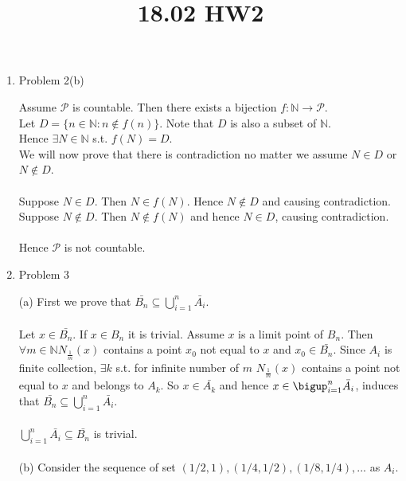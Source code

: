 \documentclass{article}
\title{18.02 HW2}
\begin{document}
\maketitle

\begin{enumerate}
    \item Problem 2(b)
    
        Assume $\mathcal{P}$ is countable. Then there exists a bijection $f: \mathbb{N} \to \mathcal{P}$. \\ 
        Let $D = \{n \in \mathbb{N} : n \notin f(n)\}$. Note that $D$ is also a subset of $\mathbb{N}$.
        \\
        Hence $\exists N \in \mathbb{N}$ s.t. $f(N) = D$.
        \\
        We will now prove that there is contradiction no matter we assume $N \in D$ or $N \notin D$.
        \\
        \\
        Suppose $N \in D$. Then $N \in f(N)$. Hence $N \notin D$ and causing contradiction.
        \\
        Suppose $N \notin D$. Then $N \notin f(N)$ and hence $N \in D$, causing contradiction.
        \\
        \\
        Hence $\mathcal{P}$ is not countable.


    \item Problem 3
    
        (a) First we prove that $\bar{B_n} \subseteq \bigcup_{i=1}^{n} \bar{A_i}$.
        \\
        \\
        Let $x \in \bar{B_n}$. If $x \in B_n$ it is trivial. Assume $x$ is a limit point of $B_n$. Then $\forall m \in \mathbb{N} N_{\frac{1}{m}}(x)$ contains a point $x_0$ not equal to $x$ and $x_0 \in \bar{B_n}$. Since $A_i$ is finite collection, $\exists k$ s.t. for infinite number of $m$ $N_{\frac{1}{m}}(x)$ contains a point not equal to $x$ and belongs to $A_k$. So $x \in \bar{A_k}$ and hence $x \in \bigup_{i=1}^{n}\bar{A_i}$, induces that $\bar{B_n} \subseteq \bigcup_{i=1}^{n} \bar{A_i}$.
        \\
        \\
        $\bigcup_{i=1}^{n} \bar{A_i} \subseteq \bar{B_n}$ is trivial.
        \\
        \\
        (b) Consider the sequence of set $(1/2, 1), (1/4, 1/2), (1/8, 1/4), ...$ as $A_i$.
\end{enumerate}
\end{document}
